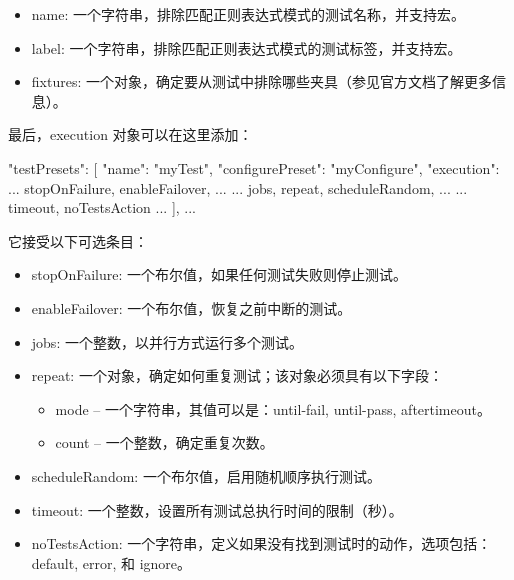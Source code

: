 \begin{itemize}
\item
name: 一个字符串，排除匹配正则表达式模式的测试名称，并支持宏。

\item
label: 一个字符串，排除匹配正则表达式模式的测试标签，并支持宏。

\item
fixtures: 一个对象，确定要从测试中排除哪些夹具（参见官方文档了解更多信息）。
\end{itemize}

最后，execution 对象可以在这里添加：

\begin{json}
    "testPresets": [
        {
            "name": "myTest",
            "configurePreset": "myConfigure",
            "execution": {
                ... stopOnFailure, enableFailover, ...
                ... jobs, repeat, scheduleRandom, ...
                ... timeout, noTestsAction ...
            }
        }
    ],
...
\end{json}

它接受以下可选条目：

\begin{itemize}
\item
stopOnFailure: 一个布尔值，如果任何测试失败则停止测试。

\item
enableFailover: 一个布尔值，恢复之前中断的测试。

\item
jobs: 一个整数，以并行方式运行多个测试。

\item
repeat: 一个对象，确定如何重复测试；该对象必须具有以下字段：
\begin{itemize}
\item
mode – 一个字符串，其值可以是：until-fail, until-pass, aftertimeout。

\item
count – 一个整数，确定重复次数。
\end{itemize}

\item
scheduleRandom: 一个布尔值，启用随机顺序执行测试。

\item
timeout: 一个整数，设置所有测试总执行时间的限制（秒）。

\item
noTestsAction: 一个字符串，定义如果没有找到测试时的动作，选项包括：default, error, 和 ignore。
\end{itemize}

